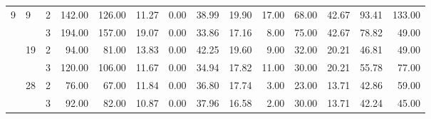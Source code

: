 \begin{tabular}{lllrrrrrrrrrrr}
\multirow{6}{*}{9} & \multirow{2}{*}{9} & 2 &   142.00 &    126.00 & 11.27 &    0.00 &   38.99 &   19.90 &   17.00 &   68.00 &   42.67 &  93.41 &   133.00 \\
  &    & 3 &   194.00 &    157.00 & 19.07 &    0.00 &   33.86 &   17.16 &    8.00 &   75.00 &   42.67 &  78.82 &    49.00 \\
\cline{2-14}
  & \multirow{2}{*}{19} & 2 &    94.00 &     81.00 & 13.83 &    0.00 &   42.25 &   19.60 &    9.00 &   32.00 &   20.21 &  46.81 &    49.00 \\
  &    & 3 &   120.00 &    106.00 & 11.67 &    0.00 &   34.94 &   17.82 &   11.00 &   30.00 &   20.21 &  55.78 &    77.00 \\
\cline{2-14}
  & \multirow{2}{*}{28} & 2 &    76.00 &     67.00 & 11.84 &    0.00 &   36.80 &   17.74 &    3.00 &   23.00 &   13.71 &  42.86 &    59.00 \\
  &    & 3 &    92.00 &     82.00 & 10.87 &    0.00 &   37.96 &   16.58 &    2.00 &   30.00 &   13.71 &  42.24 &    45.00 \\
\bottomrule
\end{tabular}
